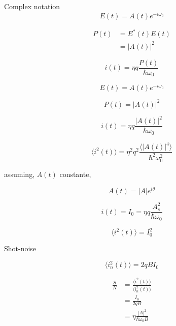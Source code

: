 Complex notation
\begin{equation}
	E(t) = A(t) e^{-i \omega_0}
\end{equation}

\begin{align}
	P(t) &= E^{*}(t) E(t)\nonumber\\
         &= |A(t)|^2
\end{align}

\begin{equation}
	i(t) = \eta q \frac{P(t)}{\hbar \omega_0}
\end{equation}


\begin{equation}
	E(t) = A(t) e^{-i \omega_0}
\end{equation}

\begin{equation}
	P(t) = |A(t)|^2
\end{equation}

\begin{equation}
	i(t) = \eta q \frac{|A(t)|^2}{\hbar \omega_0}
\end{equation}

\begin{equation}
	\langle i^2(t) \rangle = \eta^2 q^2 \frac{\langle |A(t)|^4 \rangle }{\hbar^2 \omega_0^2}
\end{equation}

assuming, $A(t)$ constante,

\begin{equation}
	A(t) = |A| e^{i \theta}
\end{equation}

\begin{equation}
	i(t) = I_0 = \eta q \frac{A_s^2}{\hbar \omega_0}
\end{equation}

\begin{equation}
	\langle i^2(t) \rangle = I_0^2
\end{equation}

Shot-noise

\begin{equation}
	\langle i_n^2(t) \rangle = 2 q B I_0
\end{equation}

\begin{align}
	\frac{S}{N} &= \frac{\langle i^2(t) \rangle}{\langle i_n^2(t) \rangle} \nonumber\\
                &= \frac{I_0}{2 q B}\nonumber\\
                &= \eta \frac{ |A|^2}{\hbar \omega_0 B}
\end{align}


